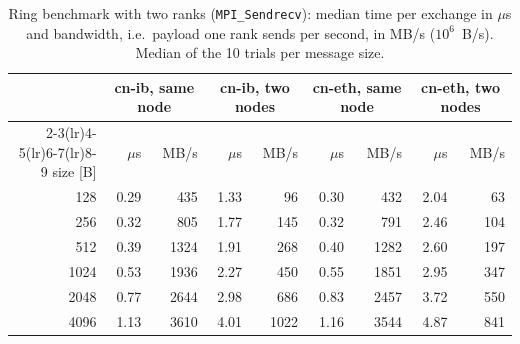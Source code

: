 \begin{table}[ht]
\centering
\small
\begin{tabular}{rrrrrrrrr}
\toprule
 & \multicolumn{2}{c}{cn-ib, same node} & \multicolumn{2}{c}{cn-ib, two nodes} & \multicolumn{2}{c}{cn-eth, same node} & \multicolumn{2}{c}{cn-eth, two nodes} \\
\cmidrule(lr){2-3}\cmidrule(lr){4-5}\cmidrule(lr){6-7}\cmidrule(lr){8-9}
size [B] & $\mu$s & MB/s & $\mu$s & MB/s & $\mu$s & MB/s & $\mu$s & MB/s \\ \midrule
128 & 0.29 & 435 & 1.33 & 96 & 0.30 & 432 & 2.04 & 63 \\
256 & 0.32 & 805 & 1.77 & 145 & 0.32 & 791 & 2.46 & 104 \\
512 & 0.39 & 1324 & 1.91 & 268 & 0.40 & 1282 & 2.60 & 197 \\
1024 & 0.53 & 1936 & 2.27 & 450 & 0.55 & 1851 & 2.95 & 347 \\
2048 & 0.77 & 2644 & 2.98 & 686 & 0.83 & 2457 & 3.72 & 550 \\
4096 & 1.13 & 3610 & 4.01 & 1022 & 1.16 & 3544 & 4.87 & 841 \\
\bottomrule
\end{tabular}
\caption{Ring benchmark with two ranks (\texttt{MPI\_Sendrecv}): median time per exchange in $\mu$s and bandwidth, i.e.\ payload one rank sends per second, in MB/s ($10^6$~B/s). Median of the 10 trials per message size.}
\label{tab:ring}
\end{table}
